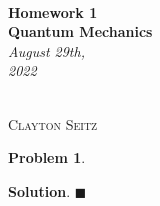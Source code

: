 \documentclass[12pt]{article}
\newtheorem{p}{Problem}[section]
\theoremstyle{definition}
\newenvironment{s}{%
        \begin{trivlist} \item \textbf{Solution}. }{%
            \hspace*{\fill} $\blacksquare$\end{trivlist}}%
\begin{document}
{\noindent\Huge\bf  \\[0.5\baselineskip] {\selectfont  Homework 1}         }\\[2\baselineskip] %
{ {\bf {}\selectfont Quantum Mechanics}\\ {\textit{\selectfont     August 29th, 2022}}}~~~~~~~~~~~~~~~~~~~~~~~~~~~~~~~~~~~~~~~~~~~~~~~~~~~~~~~~~~~~~~~~~~~~~~~~~~~~~    {\large \textsc{Clayton Seitz}
\\[1.4\baselineskip] 

\begin{p}
\end{p}

\begin{s} 
\end{s}
\end{document}
